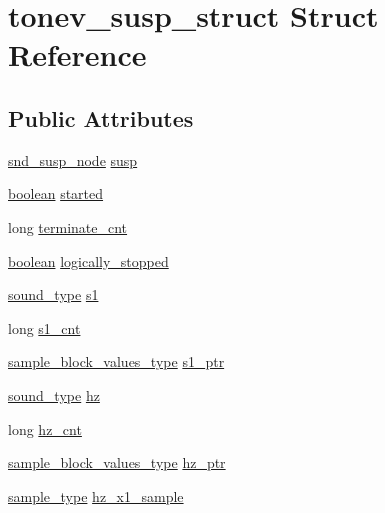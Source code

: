 \hypertarget{structtonev__susp__struct}{}\section{tonev\+\_\+susp\+\_\+struct Struct Reference}
\label{structtonev__susp__struct}
\subsection*{Public Attributes}
\begin{DoxyCompactItemize}
\item 
\hyperlink{sound_8h_a6b268203688a934bd798ceb55f85d4c0}{snd\+\_\+susp\+\_\+node} \hyperlink{structtonev__susp__struct_aaca45d0c0b13e73fff441ff7473fd113}{susp}
\item 
\hyperlink{cext_8h_a7670a4e8a07d9ebb00411948b0bbf86d}{boolean} \hyperlink{structtonev__susp__struct_a8c111657d5ddc33270f50a9b6a785147}{started}
\item 
long \hyperlink{structtonev__susp__struct_ae8cfac673ead57d568e3110f9b95bcad}{terminate\+\_\+cnt}
\item 
\hyperlink{cext_8h_a7670a4e8a07d9ebb00411948b0bbf86d}{boolean} \hyperlink{structtonev__susp__struct_a4b40a878a06bb09d9d44166f46cc825f}{logically\+\_\+stopped}
\item 
\hyperlink{sound_8h_a792cec4ed9d6d636d342d9365ba265ea}{sound\+\_\+type} \hyperlink{structtonev__susp__struct_a1a8fd08dec5a86cbaf62060825ffbc9a}{s1}
\item 
long \hyperlink{structtonev__susp__struct_a942ea708be20077cf3a5aea768f7706b}{s1\+\_\+cnt}
\item 
\hyperlink{sound_8h_a83d17f7b465d1591f27cd28fc5eb8a03}{sample\+\_\+block\+\_\+values\+\_\+type} \hyperlink{structtonev__susp__struct_a234976574d94f51206ec30e23afeaa10}{s1\+\_\+ptr}
\item 
\hyperlink{sound_8h_a792cec4ed9d6d636d342d9365ba265ea}{sound\+\_\+type} \hyperlink{structtonev__susp__struct_a0a828e5b180a1ffbfe5b0c3e73dbba0e}{hz}
\item 
long \hyperlink{structtonev__susp__struct_a7120f181d2cbeb876d5faba29011ad89}{hz\+\_\+cnt}
\item 
\hyperlink{sound_8h_a83d17f7b465d1591f27cd28fc5eb8a03}{sample\+\_\+block\+\_\+values\+\_\+type} \hyperlink{structtonev__susp__struct_a8346a0c6b3b0ea8afd1d1254ce74d775}{hz\+\_\+ptr}
\item 
\hyperlink{sound_8h_a3a9d1d4a1c153390d2401a6e9f71b32c}{sample\+\_\+type} \hyperlink{structtonev__susp__struct_a732ee25c4bd6319c7697e23f50820dbb}{hz\+\_\+x1\+\_\+sample}

\end{DoxyCompactItemize}
